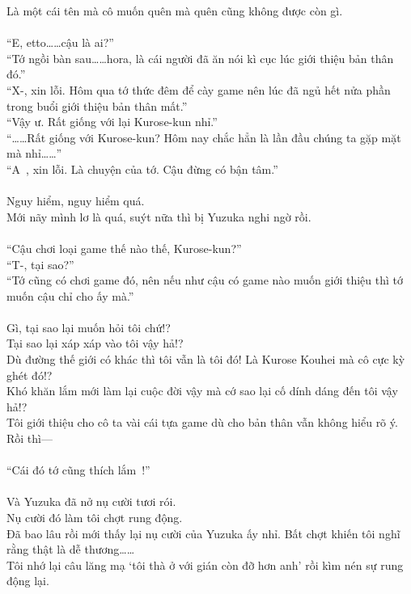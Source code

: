 \documentclass[12pt,a4paper, twosides]{book}
\begin{document}
Là một cái tên mà cô muốn quên mà quên cũng không được còn gì.\\
\\
“E, etto……cậu là ai?”\\
“Tớ ngồi bàn sau……hora, là cái người đã ăn nói kì cục lúc giới thiệu bản thân đó.”\\
“X-, xin lỗi. Hôm qua tớ thức đêm để cày game nên lúc đã ngủ hết nửa phần trong buổi giới thiệu bản thân mất.”\\
“Vậy ư. Rất giống với lại Kurose-kun nhỉ.”\\
“……Rất giống với Kurose-kun? Hôm nay chắc hẳn là lần đầu chúng ta gặp mặt mà nhỉ……”\\
“A~, xin lỗi. Là chuyện của tớ. Cậu đừng có bận tâm.”\\
\\
Nguy hiểm, nguy hiểm quá.\\
Mới nãy mình lơ là quá, suýt nữa thì bị Yuzuka nghi ngờ rồi.\\
\\
“Cậu chơi loại game thế nào thế, Kurose-kun?”\\
“T-, tại sao?”\\
“Tớ cũng có chơi game đó, nên nếu như cậu có game nào muốn giới thiệu thì tớ muốn cậu chỉ cho ấy mà.”\\
\\
Gì, tại sao lại muốn hỏi tôi chứ!?\\
Tại sao lại xáp xáp vào tôi vậy hả!?\\
Dù đường thế giới có khác thì tôi vẫn là tôi đó! Là Kurose Kouhei mà cô cực kỳ ghét đó!?\\
Khó khăn lắm mới làm lại cuộc đời vậy mà cớ sao lại cố dính dáng đến tôi vậy hả!?\\
Tôi giới thiệu cho cô ta vài cái tựa game dù cho bản thân vẫn không hiểu rõ ý.\\
Rồi thì—\\
\\
“Cái đó tớ cũng thích lắm~!”\\
\\
Và Yuzuka đã nở nụ cười tươi rói.\\
Nụ cười đó làm tôi chợt rung động.\\
Đã bao lâu rồi mới thấy lại nụ cười của Yuzuka ấy nhỉ. Bất chợt khiến tôi nghĩ rằng thật là dễ thương……\\
Tôi nhớ lại câu lăng mạ ‘tôi thà ở với gián còn đỡ hơn anh’ rồi kìm nén sự rung động lại.\\
\\
\end{document}
